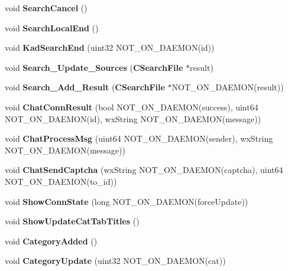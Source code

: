 \begin{DoxyCompactItemize}
\item 
void {\bfseries SearchCancel} ()\label{namespaceMuleNotify_a14bc7b19e89ad9424756adc45008d976}

\item 
void {\bfseries SearchLocalEnd} ()\label{namespaceMuleNotify_a69d6060a4da6aeb2a20e5e0e1ee3172d}

\item 
void {\bfseries KadSearchEnd} (uint32 NOT\_\-ON\_\-DAEMON(id))\label{namespaceMuleNotify_afdbddcca5e084afe5c0fc0be87bd3ca9}

\item 
void {\bfseries Search\_\-Update\_\-Sources} ({\bf CSearchFile} $\ast$result)\label{namespaceMuleNotify_a710375fe784e4a407558880e82f296fb}

\item 
void {\bfseries Search\_\-Add\_\-Result} ({\bf CSearchFile} $\ast$NOT\_\-ON\_\-DAEMON(result))\label{namespaceMuleNotify_a1476f056901cd14ea4333f75ebf24121}

\item 
void {\bfseries ChatConnResult} (bool NOT\_\-ON\_\-DAEMON(success), uint64 NOT\_\-ON\_\-DAEMON(id), wxString NOT\_\-ON\_\-DAEMON(message))\label{namespaceMuleNotify_a06fa41607585575d6af9139b8931c8b5}

\item 
void {\bfseries ChatProcessMsg} (uint64 NOT\_\-ON\_\-DAEMON(sender), wxString NOT\_\-ON\_\-DAEMON(message))\label{namespaceMuleNotify_abce4737d3ee0ac0f190d0e1c504d08c0}

\item 
void {\bfseries ChatSendCaptcha} (wxString NOT\_\-ON\_\-DAEMON(captcha), uint64 NOT\_\-ON\_\-DAEMON(to\_\-id))\label{namespaceMuleNotify_a81c5f467271b7df33800304194fc0e26}

\item 
void {\bfseries ShowConnState} (long NOT\_\-ON\_\-DAEMON(forceUpdate))\label{namespaceMuleNotify_a74761621da92d0f578d31ad9aafc5586}

\item 
void {\bfseries ShowUpdateCatTabTitles} ()\label{namespaceMuleNotify_ad57a3165de7915d8f96df2a1f47d0144}

\item 
void {\bfseries CategoryAdded} ()\label{namespaceMuleNotify_a6cf043de8f02b724c6c9f3b5dbed895e}

\item 
void {\bfseries CategoryUpdate} (uint32 NOT\_\-ON\_\-DAEMON(cat))\label{namespaceMuleNotify_a7d27cac88f0b31b0f3239869fbc9bd21}


\end{DoxyCompactItemize}
